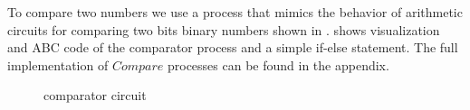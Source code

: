 To compare two numbers we use a process that mimics the behavior of arithmetic circuits for comparing two bits binary numbers shown in 
.
 shows visualization and  ABC code of the comparator process and a simple if-else statement.
The full implementation of $Compare$ processes can be found in the appendix.
\begin{figure}[H]%
\centering
{}
\caption{comparator circuit}
\label{tra_comparator_circuit}%
\end{figure}


